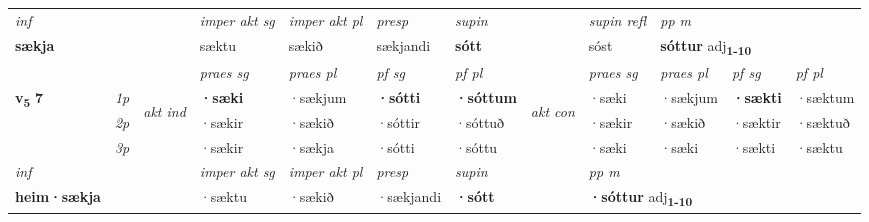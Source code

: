 \begin{longtable}[l]{X>{\footnotesize\itshape}llXXXXlXXXX}
   {\textit{inf}} & &  & \textit{imper akt sg} & \textit{imper akt pl}   & \textit{presp} & \textit{supin} && \textit{supin refl} & \textit{pp m} \\*
  {\textbf{sækja}} & && sæktu  & sækið   & sækjandi &  \textbf{sótt} && sóst & \multicolumn{2}{l}{\textbf{sóttur} adj\textbf{\textsubscript{1-10}}} \\*

\midrule

 & &   & \textit{praes sg}  & \textit{praes pl}    & \textit{ pf sg} & \textit{pf pl} & & \textit{praes sg}  & \textit{praes pl}    & \textit{pf sg} & \textit{pf pl }  \\ \cmidrule{4-7} \cmidrule{9-12}
 \multirow{2}{*}{{{\textbf{v{\textsubscript{5}}} \Large{\textbf{7}}}}}  & 1p & \multirow{3}{*}{\begin{turn}{90}\textit{akt ind}\end{turn}} & \textbf{·sæki} & ·sækjum & \textbf{·sótti} & \textbf{·sóttum} & \multirow{3}{*}{\begin{turn}{90}\textit{akt con}\end{turn}} &·sæki & ·sækjum & \textbf{·sækti} & ·sæktum\\*
 & 2p &  &  ·sækir  & ·sækið & ·sóttir & ·sóttuð & & ·sækir & ·sækið & ·sæktir & ·sæktuð \\*
 & 3p &  & ·sækir & ·sækja & ·sótti & ·sóttu & & ·sæki & ·sæki& ·sækti & ·sæktu \\*
\cmidrule{4-7} \cmidrule{9-12}

   {\textit{inf}} & &  & \textit{imper akt sg} & \textit{imper akt pl}   & \textit{presp} & \textit{supin}  && \textit{pp m} \\*
  {\textbf{heim\allowbreak ·sækja}} & && ·sæktu  & ·sækið   & ·sækjandi &  \textbf{·sótt}  && \multicolumn{2}{l}{\textbf{·sóttur} adj\textbf{\textsubscript{1-10}}} \\*

\midrule


\end{longtable}
